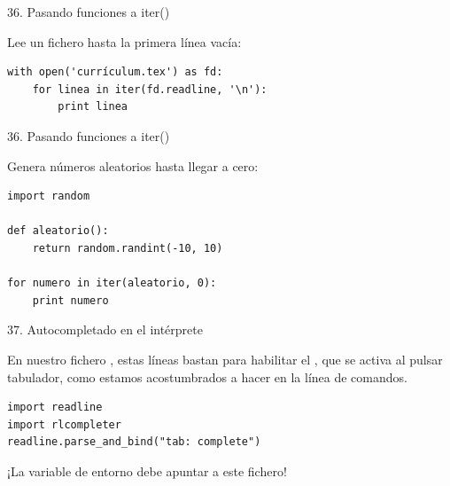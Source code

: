 \documentclass[14pt]{beamer}
\begin{document}
\begin{frame}[fragile]{36. Pasando funciones a iter()}
  \small
  \begin{exampleblock}
    {Lee un fichero hasta la primera línea vacía:}
    \begin{lstlisting}
with open('currículum.tex') as fd:
    for linea in iter(fd.readline, '\n'):
        print linea
    \end{lstlisting}
  \end{exampleblock}
\end{frame}

\begin{frame}[fragile]{36. Pasando funciones a iter()}
  \small
  \begin{exampleblock}
    {Genera números aleatorios hasta llegar a cero:}
    \begin{lstlisting}
import random

def aleatorio():
    return random.randint(-10, 10)

for numero in iter(aleatorio, 0):
    print numero
    \end{lstlisting}
  \end{exampleblock}
\end{frame}

\begin{frame}[fragile]{37. Autocompletado en el intérprete}
  \small
  \begin{block}{}
    \centering
    En nuestro fichero , estas líneas bastan para
    habilitar el , que se activa al pulsar
    tabulador, como estamos acostumbrados a hacer en la línea de
    comandos.
  \end{block}

  \begin{exampleblock}{}
    \begin{lstlisting}
import readline
import rlcompleter
readline.parse_and_bind("tab: complete")
    \end{lstlisting}
  \end{exampleblock}

  \footnotesize
  \begin{alertblock}{}
    \centering
    ¡La variable de entorno  debe apuntar a este fichero!
  \end{alertblock}
\end{frame}
\end{document}
